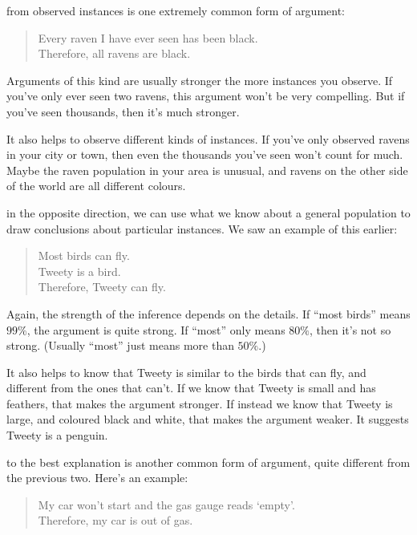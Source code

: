 \documentclass[justified]{tufte-book}
\newenvironment{argument}{\begin{quote}\normalsize}{\end{quote}}
\theoremstyle{definition}
\theoremstyle{definition}
\theoremstyle{definition}
\theoremstyle{remark}
\begin{document}
 from observed instances is one extremely common form of argument:

\begin{argument}
Every raven I have ever seen has been black.\\
Therefore, all ravens are black.
\end{argument}

Arguments of this kind are usually stronger the more instances you observe. If you've only ever seen two ravens, this argument won't be very compelling. But if you've seen thousands, then it's much stronger.

It also helps to observe different kinds of instances. If you've only observed ravens in your city or town, then even the thousands you've seen won't count for much. Maybe the raven population in your area is unusual, and ravens on the other side of the world are all different colours.

 in the opposite direction, we can use what we know about a general population to draw conclusions about particular instances. We saw an example of this earlier:

\begin{argument}
Most birds can fly.\\
Tweety is a bird.\\
Therefore, Tweety can fly.
\end{argument}

Again, the strength of the inference depends on the details. If ``most birds'' means \(99\%\), the argument is quite strong. If ``most'' only means \(80\%\), then it's not so strong. (Usually ``most'' just means more than \(50\%\).)

It also helps to know that Tweety is similar to the birds that can fly, and different from the ones that can't. If we know that Tweety is small and has feathers, that makes the argument stronger. If instead we know that Tweety is large, and coloured black and white, that makes the argument weaker. It suggests Tweety is a penguin.

 to the best explanation is another common form of argument, quite different from the previous two. Here's an example:

\begin{argument}
My car won't start and the gas gauge reads `empty'.\\
Therefore, my car is out of gas.
\end{argument}
\end{document}
